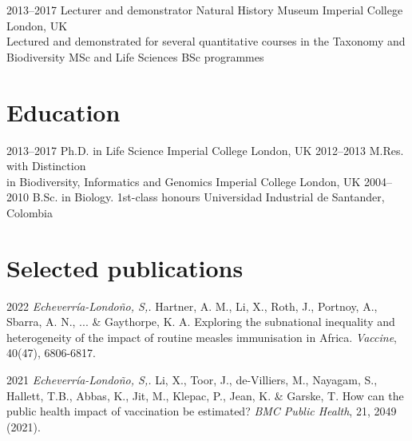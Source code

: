 \documentclass[icon]{twentysecondcv}
\begin{document}
\begin{twenty}
    
    \twentyitem
	{2013--2017}
	{Lecturer and demonstrator}
	{Natural History Museum  Imperial College London, UK}
	{\\ \small Lectured and demonstrated for several quantitative courses in the Taxonomy and Biodiversity MSc and Life Sciences BSc programmes}

\end{twenty}


\section{Education}

\begin{twenty}
  \twentyitem
    {2013--2017}
    {Ph.D. {\normalfont in Life Science}}
    {Imperial College London, UK}
    {}
  \twentyitem
    {2012--2013}
    {M.Res. with Distinction \\  {\normalfont in Biodiversity, Informatics and Genomics}}
    {Imperial College London, UK}
    {}
  \twentyitem
    {2004--2010}
    {B.Sc. in Biology. 1st-class honours}
    {Universidad Industrial de Santander, Colombia}
    {}
 \end{twenty}
 
 
 \section{Selected publications}

\small
2022 \textit{Echeverr\'ia-Londo\~no, S,.}  Hartner, A. M., Li, X., Roth, J., Portnoy, A., Sbarra, A. N., ... \& Gaythorpe, K. A. Exploring the subnational inequality and heterogeneity of the impact of routine measles immunisation in Africa. \textit{Vaccine}, 40(47), 6806-6817. 

2021 \textit{Echeverr\'ia-Londo\~no, S,.}  Li, X., Toor, J., de-Villiers, M., Nayagam, S., Hallett, T.B., Abbas, K., Jit, M., Klepac, P., Jean, K. \&  Garske, T. How can the public health impact of vaccination be estimated? \textit{BMC Public Health}, 21, 2049 (2021).
\end{document}
